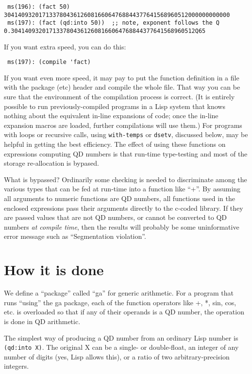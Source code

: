 \documentclass{article}
\begin{document}
\begin{verbatim}
 ms(196): (fact 50)
30414093201713378043612608166064768844377641568960512000000000000
 ms(197): (fact (qd:into 50))  ;; note, exponent follows the Q
0.30414093201713378043612608166064768844377641568960512Q65
\end{verbatim}

If you want extra speed, you can do this:
\begin{verbatim}
 ms(197): (compile 'fact)
\end{verbatim}
If you want even more speed, it may pay to put the function
definition in a file with the package (etc) header and compile
the whole file. That way you can be sure that the environment
of the compilation process is correct.  (It is entirely
possible to run previously-compiled programs in a Lisp
system that knows nothing about the equivalent in-line
expansions of code; once the in-line expansion macros are
loaded, further compilations will use them.)
For programs with loops or recursive calls,
using {\tt with-temps} or {\tt dsetv}, discussed below, may
be helpful in getting the best efficiency.  The effect of using
these functions on expressions computing QD numbers is that run-time
type-testing and most of the storage re-allocation is bypased.

What is bypassed?  Ordinarily some checking is needed to discriminate
among the various types that can be fed at run-time into a function
like ``+''.  By assuming all arguments to numeric functions are QD
numbers, all functions used in the enclosed expressions pass their
arguments directly to the c-coded library.  If they are passed values
that are not QD numbers, or cannot be converted to QD numbers {\em at
compile time}, then the results will probably be some uninformative
error message such as ``Segmentation violation''.

\section{How it is done}
We define a ``package'' called ``ga'' for generic arithmetic.  For
a program that runs ``using'' the ga package, each of the function
operators like +, *, sin, cos, etc.  is overloaded so that if any
of their operands is a QD number, the operation is done in QD arithmetic.

The simplest way of producing a QD number from an ordinary
Lisp number is {\tt (qd:into X)}.  The original X can be a single- or
double-float, an integer of any number of digits (yes, Lisp allows this),
or a ratio of two arbitrary-precision integers.
\end{document}
